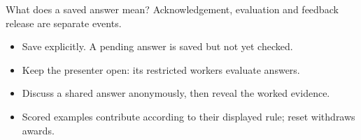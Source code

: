 \begin{frame}[t]{What does a saved answer mean?}
Acknowledgement, evaluation and feedback release are separate events.
\medskip
\begin{itemize}
\item Save explicitly. A pending answer is saved but not yet checked.
\item Keep the presenter open: its restricted workers evaluate answers.
\item Discuss a shared answer anonymously, then reveal the worked evidence.
\item Scored examples contribute according to their displayed rule; reset withdraws awards.
\end{itemize}
\end{frame}
